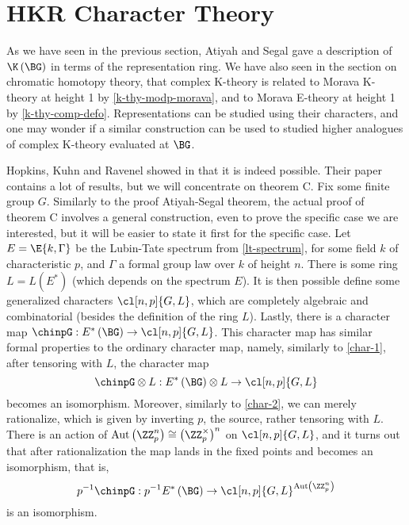 \section{HKR Character Theory}

As we have seen in the previous section, Atiyah and Segal gave a description of $\K\left(\BG\right)$ in terms of the representation ring.
We have also seen in the section on chromatic homotopy theory, that complex K-theory is related to Morava K-theory at height 1 by \ref{k-thy-modp-morava}, and to Morava E-theory at height 1 by \ref{k-thy-comp-defo}.
Representations can be studied using their characters, and one may wonder if a similar construction can be used to studied higher analogues of complex K-theory evaluated at $\BG$.

Hopkins, Kuhn and Ravenel showed in \cite{HKR} that it is indeed possible.
Their paper contains a lot of results, but we will concentrate on theorem C.
Fix some finite group $G$.
Similarly to the proof Atiyah-Segal theorem, the actual proof of theorem C involves a general construction, even to prove the specific case we are interested, but it will be easier to state it first for the specific case.
Let $E = \E{k, \Gamma}$ be the Lubin-Tate spectrum from \ref{lt-spectrum}, for some field $k$ of characteristic $p$, and $\Gamma$ a formal group law over $k$ of height $n$. 
There is some ring $L = L\left(E^*\right)$ (which depends on the spectrum $E$).
It is then possible define some generalized characters $\cl[n,p]{G, L}$, which are completely algebraic and combinatorial (besides the definition of the ring $L$).
Lastly, there is a character map $\chinpG: E^*\left(\BG\right) \to \cl[n,p]{G, L}$.
This character map has similar formal properties to the ordinary character map, namely, similarly to \ref{char-1}, after tensoring with $L$, the character map
$$
\chinpG \otimes L:
E^*\left(\BG\right) \otimes L
\to \cl[n,p]{G, L}
$$
becomes an isomorphism.
Moreover, similarly to \ref{char-2}, we can merely rationalize, which is given by inverting $p$, the source, rather tensoring with $L$.
There is an action of $\aut\left(\ZZ_p^n\right) \cong \left(\ZZ_p^\times\right)^n$ on $\cl[n,p]{G, L}$, and it turns out that after rationalization the map lands in the fixed points and becomes an isomorphism, that is,
$$
p^{-1} \chinpG:
p^{-1} E^*\left(\BG\right)
\to \cl[n,p]{G, L}^{\aut\left(\ZZ_p^n\right)}
$$
is an isomorphism.




